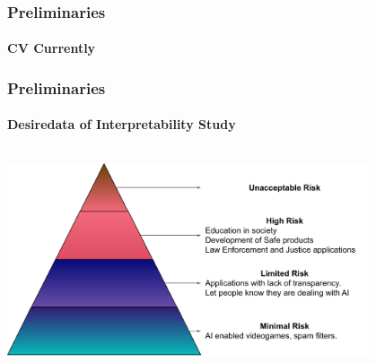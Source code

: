 \begin{frame}[t]
    \frametitle{Preliminaries}
    \framesubtitle{CV Currently}
    
\end{frame}
\begin{frame}[t]
    \frametitle{Preliminaries}
    \framesubtitle{Desiredata of Interpretability Study}
    \begin{columns}[c]
        \begin{center}
            \includegraphics[width=0.8\textwidth]{fig/rel/common/img/AI_act_pyramid.pdf}
        \end{center}
    \end{columns}

\end{frame}